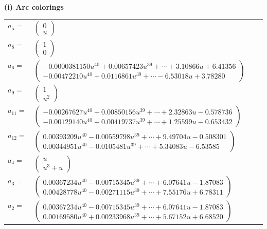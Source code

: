 \documentclass[1p]{elsarticle_modified}
\theoremstyle{definition}
\begin{document}
\flushleft \textbf{(i) Arc colorings}\\
\begin{tabular}{m{7pt} m{180pt} m{7pt} m{180pt} }
\flushright $a_{5}=$&$\begin{pmatrix}0\\u\end{pmatrix}$ \\
\flushright $a_{8}=$&$\begin{pmatrix}1\\0\end{pmatrix}$ \\
\flushright $a_{6}=$&$\begin{pmatrix}-0.0000381150 u^{40}+0.00657423 u^{39}+\cdots+3.10866 u+6.41356\\-0.00472210 u^{40}+0.0116861 u^{39}+\cdots-6.53018 u+3.78280\end{pmatrix}$ \\
\flushright $a_{9}=$&$\begin{pmatrix}1\\u^2\end{pmatrix}$ \\
\flushright $a_{11}=$&$\begin{pmatrix}-0.00267627 u^{40}+0.00850156 u^{39}+\cdots+2.32863 u-0.578736\\-0.00129140 u^{40}+0.00419737 u^{39}+\cdots+1.25599 u-0.653432\end{pmatrix}$ \\
\flushright $a_{12}=$&$\begin{pmatrix}0.00393209 u^{40}-0.00559798 u^{39}+\cdots+9.49704 u-0.508301\\0.00344951 u^{40}-0.0105481 u^{39}+\cdots+5.34083 u-6.53585\end{pmatrix}$ \\
\flushright $a_{4}=$&$\begin{pmatrix}u\\u^3+u\end{pmatrix}$ \\
\flushright $a_{3}=$&$\begin{pmatrix}0.00367234 u^{40}-0.00715345 u^{39}+\cdots+6.07641 u-1.87083\\0.00428778 u^{40}-0.00271115 u^{39}+\cdots+7.55176 u+6.78311\end{pmatrix}$ \\
\flushright $a_{2}=$&$\begin{pmatrix}0.00367234 u^{40}-0.00715345 u^{39}+\cdots+6.07641 u-1.87083\\0.00169580 u^{40}+0.00233968 u^{39}+\cdots+5.67152 u+6.68520\end{pmatrix}$ \\

\end{tabular}
\end{document}
